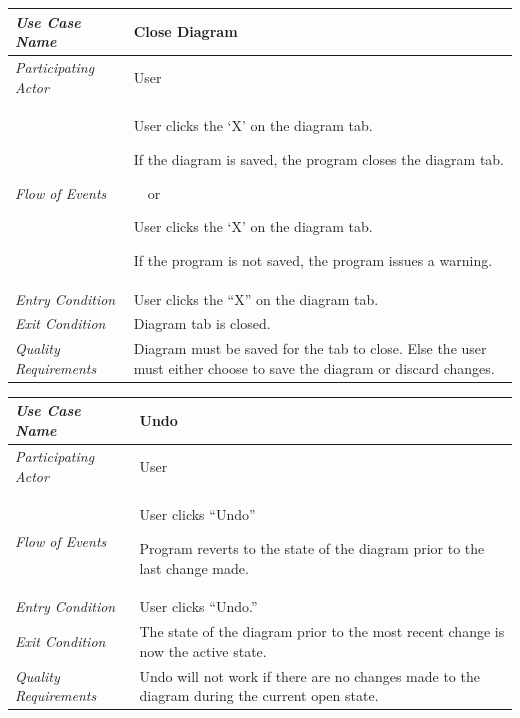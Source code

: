 \documentclass[twoside,letterpaper]{article}
\newenvironment{my_enumerate}{
\begin{enumerate}
  \setlength{\itemsep}{1pt}
  \setlength{\parskip}{0pt}
  \setlength{\parsep}{0pt}}{\end{enumerate}
}
\begin{document}
\begin{flushleft}
\tablehead{}
\begin{tabular}{|m{2.0in} m{5.0in}|}
\hline
{\bfseries\emph{Use Case Name}}
& {\bfseries Close Diagram}
\\\hline
\emph{Participating Actor}
& User
\\\hline
\emph{Flow of Events}
& \begin{my_enumerate}
\item User clicks the `X' on the diagram tab.
\item If the diagram is saved, the program closes the diagram tab.
\end{my_enumerate}
\ ~or
\begin{my_enumerate}
\item User clicks the `X' on the diagram tab.
\item If the program is not saved, the program issues a warning.
\end{my_enumerate}
\\\hline
\emph{Entry Condition}
& User clicks the ``X'' on the diagram tab.
\\\hline
\emph{Exit Condition}
& Diagram tab is closed.
\\\hline
\emph{Quality Requirements}
& Diagram must be saved for the tab to close. Else the user must either choose to save the diagram or discard changes.
\\\hline
\end{tabular}
\end{flushleft}
\bigskip


\begin{flushleft}
\tablehead{}
\begin{tabular}{|m{2.0in} m{5.0in}|}
\hline
{\bfseries\emph{Use Case Name}}
& {\bfseries Undo}
\\\hline
\emph{Participating Actor}
& User
\\\hline
\emph{Flow of Events}
& \begin{my_enumerate}
\item User clicks ``Undo''
\item Program reverts to the state of the diagram prior to the last change made.
\end{my_enumerate}
\\\hline
\emph{Entry Condition}
& User clicks ``Undo.''
\\\hline
\emph{Exit Condition}
& The state of the diagram prior to the most recent change is now the active state.
\\\hline
\emph{Quality Requirements}
& Undo will not work if there are no changes made to the diagram during the current open state.
\\\hline
\end{tabular}
\end{flushleft}
\bigskip
\end{document}
